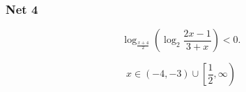\subsubsection{Net 4}
 
\zadatak 
$$
\log_{\frac{x+4}2} \left( \log_2 \frac{2x-1}{3+x} \right) < 0.
$$

\resenje
$$
x \in (-4, -3) \cup \left[ \frac12, \infty \right)
$$
